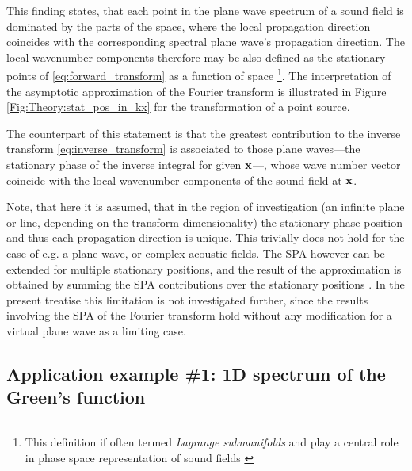 This finding states, that each point in the plane wave spectrum of a sound field is dominated by the parts of the space, where the local propagation direction coincides with the corresponding spectral plane wave's propagation direction.
The local wavenumber components therefore may be also defined as the stationary points of \eqref{eq:forward_transform} as a function of space \footnote{This definition if often termed \emph{Lagrange submanifolds} and play a central role in phase space representation of sound fields \cite{Arnold1995, Tinkelman2005, Steinberg1993}}.
The interpretation of the asymptotic approximation of the Fourier transform is illustrated in Figure \ref{Fig:Theory:stat_pos_in_kx} for the transformation of a point source.

The counterpart of this statement is that the greatest contribution to the inverse transform \eqref{eq:inverse_transform} is associated to those plane waves---the stationary phase of the inverse integral for given $\mathbf{x}$---, whose wave number vector coincide with the local wavenumber components of the sound field at $\mathbf{x}$.

Note, that here it is assumed, that in the region of investigation (an infinite plane or line, depending on the transform dimensionality) the stationary phase position and thus each propagation direction is unique.
This trivially does not hold for the case of e.g. a plane wave, or complex acoustic fields.
The SPA however can be extended for multiple stationary positions, and the result of the approximation is obtained by summing the SPA contributions over the stationary positions \cite[p. 129]{Bleistein2000}.
In the present treatise this limitation is not investigated further, since the results involving the SPA of the Fourier transform hold without any modification for a virtual plane wave as a limiting case. 	

\subsection*{Application example \#1: 1D spectrum of the Green's function}
\label{sec:greens_function_pectrum}

